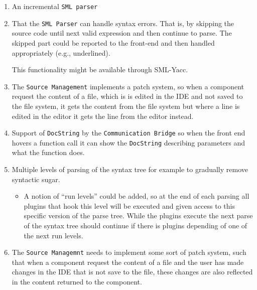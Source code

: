 \documentclass[a4paper,oneside]{article}
\begin{document}
\begin{enumerate}

\item An incremental \texttt{SML parser}

\item That the \texttt{SML Parser} can handle syntax errors. That is,
  by skipping the source code until next valid expression and then
  continue to parse. The skipped part could be reported to the
  front-end and then handled appropriately (e.g., underlined).

  This functionality might be available through SML-Yacc.

\item The \texttt{Source Management} implements a patch system, so
  when a component request the content of a file, which is is edited
  in the IDE and not saved to the file system, it gets the content
  from the file system but where a line is edited in the editor it
  gets the line from the editor instead.


\item Support of \texttt{DocString} by the \texttt{Communication
    Bridge} so when the front end hovers a function call it can show
  the \texttt{DocString} describing parameters and what the function
  does.

\item Multiple levels of parsing of the syntax tree for example to gradually
  remove syntactic sugar.
  \begin{itemize}

  \item A notion of ``run levels'' could be added, so at the end of each parsing
    all plugins that hook this level will be executed and given access to this
    specific version of the parse tree. While the plugins execute the next parse
    of the syntax tree should continue if there is plugins depending of
    one of the next run levels.

  \end{itemize}

\item The \texttt{Source Managemnt} needs to implement some sort of patch
  system, such that when a component request the content of a file and the user
  has made changes in the IDE that is not save to the file, these changes are
  also reflected in the content returned to the component.

\end{enumerate}
\end{document}
